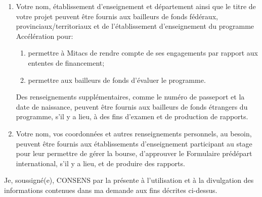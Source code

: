 {\begin{enumerate}
Vous aurez la possibilité de vous désabonner des courriels qui vous sont envoyés lorsque tous les engagements par rapport à la recherche qui fait l'objet de cette demande seront remplis.
\item Votre nom, établissement d'enseignement et département ainsi que le titre de votre projet peuvent être fournis aux bailleurs de fonds fédéraux, provinciaux/territoriaux et de l'établissement d'enseignement du programme Accélération pour:
\begin{enumerate}
\item permettre à Mitacs de rendre compte de ses engagements par rapport aux ententes de financement;
\item permettre aux bailleurs de fonds d'évaluer le programme.
\end{enumerate}
Des renseignements supplémentaires, comme le numéro de passeport et la date de naissance, peuvent être fournis aux bailleurs de fonds étrangers du programme, s'il y a lieu, à des fins d'examen et de production de rapports. 
\item Votre nom, vos coordonnées et autres renseignements personnels, au besoin, peuvent être fournis aux établissements d'enseignement participant au stage pour leur permettre de gérer la bourse, d'approuver le Formulaire prédépart international, s'il y a lieu, et de produire des rapports.
\end{enumerate}

Je, soussigné(e), CONSENS par la présente à l'utilisation et à la divulgation des informations contenues dans ma demande aux fins décrites ci-dessus.
}
